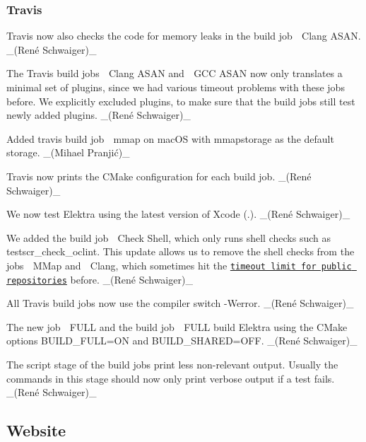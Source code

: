 \subsubsection*{Travis}


\begin{DoxyItemize}
\item Travis now also checks the code for memory leaks in the build job {\ttfamily 🍏 Clang A\+S\+AN}. \+\_\+(René Schwaiger)\+\_\+
\item The Travis build jobs {\ttfamily 🍏 Clang A\+S\+AN} and {\ttfamily 🐧 G\+CC A\+S\+AN} now only translates a minimal set of plugins, since we had various timeout problems with these jobs before. We explicitly excluded plugins, to make sure that the build jobs still test newly added plugins. \+\_\+(René Schwaiger)\+\_\+
\item Added travis build job {\ttfamily 🍏 mmap} on mac\+OS with {\ttfamily mmapstorage} as the default storage. \+\_\+(Mihael Pranjić)\+\_\+
\item Travis now prints the C\+Make configuration for each build job. \+\_\+(René Schwaiger)\+\_\+
\item We now test Elektra using the latest version of Xcode ({.}). \+\_\+(René Schwaiger)\+\_\+
\item We added the build job {\ttfamily 🍏 Check Shell}, which only runs shell checks such as {\ttfamily testscr\+\_\+check\+\_\+oclint}. This update allows us to remove the shell checks from the jobs {\ttfamily 🍏 M\+Map} and {\ttfamily 🍏 Clang}, which sometimes hit the \href{https://docs.travis-ci.com/user/customizing-the-build#build-timeouts}{\tt timeout limit for public repositories} before. \+\_\+(René Schwaiger)\+\_\+
\item All Travis build jobs now use the compiler switch {\ttfamily -\/\+Werror}. \+\_\+(René Schwaiger)\+\_\+
\item The new job {\ttfamily 🍏 F\+U\+LL} and the build job {\ttfamily 🐧 F\+U\+LL} build Elektra using the C\+Make options {\ttfamily B\+U\+I\+L\+D\+\_\+\+F\+U\+LL=ON} and {\ttfamily B\+U\+I\+L\+D\+\_\+\+S\+H\+A\+R\+ED=O\+FF}. \+\_\+(René Schwaiger)\+\_\+
\item The {\ttfamily script} stage of the build jobs print less non-\/relevant output. Usually the commands in this stage should now only print verbose output if a test fails. \+\_\+(René Schwaiger)\+\_\+
\end{DoxyItemize}

\subsection*{Website}

